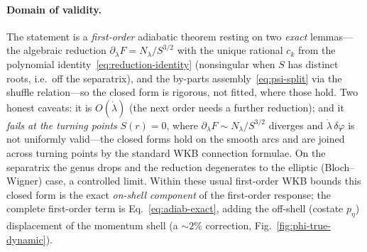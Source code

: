 \documentclass[
    aps, prd, twocolumn, superscriptaddress,
    showpacs, nofootinbib, floatfix
]{revtex4-2}
\begin{document}
\paragraph{Domain of validity.} The statement is a \emph{first-order} adiabatic
theorem resting on two \emph{exact} lemmas---the algebraic reduction
$\partial_\lambda F=N_\lambda/S^{3/2}$ with the unique rational $c_k$ from the
polynomial identity~\eqref{eq:reduction-identity} (nonsingular when $S$ has distinct
roots, i.e.\ off the separatrix), and the by-parts assembly~\eqref{eq:psi-split} via
the shuffle relation---so the closed form is rigorous, not fitted, where those hold.
Two honest caveats: it is $O(\dot\lambda)$ (the next order needs a further reduction);
and it \emph{fails at the turning points} $S(r)=0$, where
$\partial_\lambda F\sim N_\lambda/S^{3/2}$ diverges and $\dot\lambda\,\delta\varphi$ is
not uniformly valid---the closed forms hold on the smooth arcs and are joined across
turning points by the standard WKB connection formulae. On the separatrix the genus
drops and the reduction degenerates to the elliptic (Bloch--Wigner) case, a controlled
limit. Within these usual first-order WKB bounds this closed form is the exact
\emph{on-shell component} of the first-order response; the complete first-order term is
Eq.~\eqref{eq:adiab-exact}, adding the off-shell (costate $p_\eta$) displacement of the
momentum shell (a $\sim2\%$ correction, Fig.~\ref{fig:phi-true-dynamic}).


\end{document}
